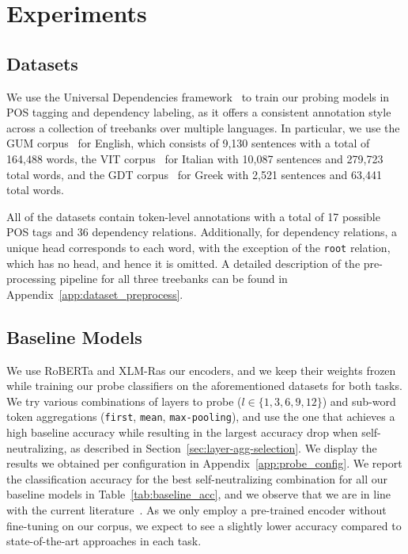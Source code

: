 \documentclass[11pt,a4paper]{article}
\begin{document}
\section{Experiments}
\subsection{Datasets}
We use the Universal Dependencies framework~\citep{nivre_universal_2020} to train our probing models in POS tagging and dependency labeling, as it offers a consistent annotation style across a collection of treebanks over multiple languages. In particular, we use the GUM corpus~\citep{zeldes_gum_2017} for English, which consists of 9,130 sentences with a total of 164,488 words, the VIT corpus~\citep{delmonte_vit_2017} for Italian with 10,087 sentences and 279,723 total words, and the GDT corpus~\citep{prokopidis_universal_2017} for Greek with 2,521 sentences and 63,441 total words.

All of the datasets contain token-level annotations with a total of 17 possible POS tags and 36 dependency relations. Additionally, for dependency relations, a unique head corresponds to each word, with the exception of the \texttt{root} relation, which has no head, and hence it is omitted. A detailed description of the pre-processing pipeline for all three treebanks can be found in Appendix~\ref{app:dataset_preprocess}.

\subsection{Baseline Models}
We use RoBERTa and XLM-R\footnotemark as our encoders, and we keep their weights frozen while training our probe classifiers on the aforementioned datasets for both tasks. We try various combinations of layers to probe ($l \in \{1, 3, 6, 9, 12\}$) and sub-word token aggregations (\texttt{first}, \texttt{mean}, \texttt{max-pooling}), and use the one that achieves a high baseline accuracy while resulting in the largest accuracy drop when self-neutralizing, as described in Section~\ref{sec:layer-agg-selection}. We display the results we obtained per configuration in Appendix~\ref{app:probe_config}. We report the classification accuracy for the best self-neutralizing combination for all our baseline models in Table~\ref{tab:baseline_acc}, and we observe that we are in line with the current literature~\citep{straka_evaluating_2019}. As we only employ a pre-trained encoder without fine-tuning on our corpus, we expect to see a slightly lower accuracy compared to state-of-the-art approaches in each task.
\end{document}
